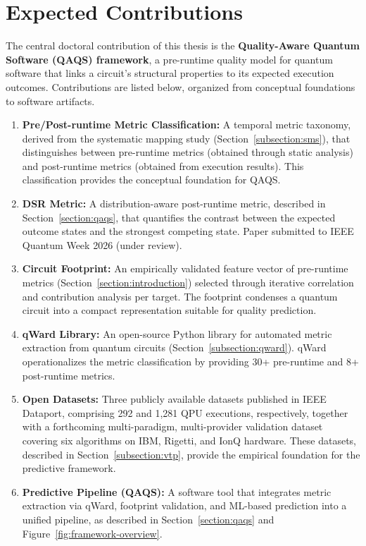 \documentclass{article}
\begin{document}
\section{Expected Contributions}
\label{section:contributions}

The central doctoral contribution of this thesis is the \textbf{Quality-Aware Quantum Software (QAQS) framework}, a pre-runtime quality model for quantum software that links a circuit's structural properties to its expected execution outcomes. Contributions are listed below, organized from conceptual foundations to software artifacts.

\begin{enumerate}

\item \textbf{Pre/Post-runtime Metric Classification:} A temporal metric taxonomy, derived from the systematic mapping study (Section~\ref{subsection:sms}), that distinguishes between pre-runtime metrics (obtained through static analysis) and post-runtime metrics (obtained from execution results). This classification provides the conceptual foundation for QAQS.
\label{c:classification}

\item \textbf{DSR Metric:} A distribution-aware post-runtime metric, described in Section~\ref{section:qaqs}, that quantifies the contrast between the expected outcome states and the strongest competing state. Paper submitted to IEEE Quantum Week 2026 (under review).
\label{c:dsr}

\item \textbf{Circuit Footprint:} An empirically validated feature vector of pre-runtime metrics (Section~\ref{section:introduction}) selected through iterative correlation and contribution analysis per target. The footprint condenses a quantum circuit into a compact representation suitable for quality prediction.
\label{c:footprint}

\item \textbf{qWard Library:} An open-source Python library \cite{marquezQwardUnifiedToolkit_2025, QiskitqwardFrameworkAnalyzing} for automated metric extraction from quantum circuits (Section~\ref{subsection:qward}). qWard operationalizes the metric classification by providing 30+ pre-runtime and 8+ post-runtime metrics.
\label{c:qward}

\item \textbf{Open Datasets:} Three publicly available datasets \cite{data_1, data_2} published in IEEE Dataport, comprising 292 and 1,281 QPU executions, respectively, together with a forthcoming multi-paradigm, multi-provider validation dataset covering six algorithms on IBM, Rigetti, and IonQ hardware. These datasets, described in Section~\ref{subsection:vtp}, provide the empirical foundation for the predictive framework.
\label{c:dataset1}

\item \textbf{Predictive Pipeline (QAQS):} A software tool that integrates metric extraction via qWard, footprint validation, and ML-based prediction into a unified pipeline, as described in Section~\ref{section:qaqs} and Figure~\ref{fig:framework-overview}.
\label{c:framework}

\end{enumerate}
\end{document}
